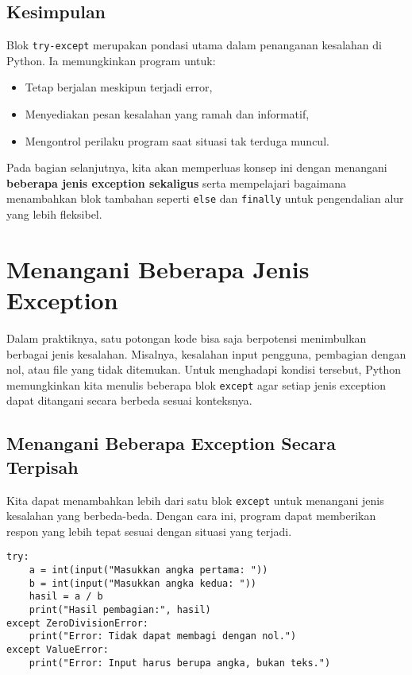 \subsection*{Kesimpulan}

Blok \texttt{try-except} merupakan pondasi utama dalam penanganan kesalahan di Python. Ia memungkinkan program untuk:
\begin{itemize}
    \item Tetap berjalan meskipun terjadi error,
    \item Menyediakan pesan kesalahan yang ramah dan informatif,
    \item Mengontrol perilaku program saat situasi tak terduga muncul.
\end{itemize}

Pada bagian selanjutnya, kita akan memperluas konsep ini dengan menangani \textbf{beberapa jenis exception sekaligus} serta mempelajari bagaimana menambahkan blok tambahan seperti \texttt{else} dan \texttt{finally} untuk pengendalian alur yang lebih fleksibel.


\section{Menangani Beberapa Jenis Exception}

Dalam praktiknya, satu potongan kode bisa saja berpotensi menimbulkan berbagai jenis kesalahan. Misalnya, kesalahan input pengguna, pembagian dengan nol, atau file yang tidak ditemukan. Untuk menghadapi kondisi tersebut, Python memungkinkan kita menulis beberapa blok \texttt{except} agar setiap jenis exception dapat ditangani secara berbeda sesuai konteksnya.

\subsection*{Menangani Beberapa Exception Secara Terpisah}

Kita dapat menambahkan lebih dari satu blok \texttt{except} untuk menangani jenis kesalahan yang berbeda-beda. Dengan cara ini, program dapat memberikan respon yang lebih tepat sesuai dengan situasi yang terjadi.

\begin{lstlisting}[style=PythonStyle, caption={Menangani beberapa exception secara terpisah}]
try:
    a = int(input("Masukkan angka pertama: "))
    b = int(input("Masukkan angka kedua: "))
    hasil = a / b
    print("Hasil pembagian:", hasil)
except ZeroDivisionError:
    print("Error: Tidak dapat membagi dengan nol.")
except ValueError:
    print("Error: Input harus berupa angka, bukan teks.")
\end{lstlisting}

